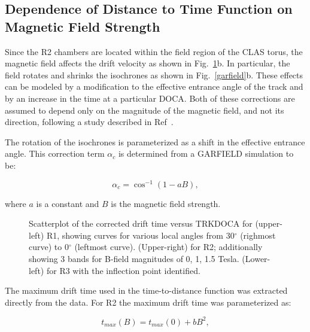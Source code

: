 \documentclass{article}
\begin{document}
\subsection{Dependence of Distance to Time Function on Magnetic Field Strength}
Since the R2 chambers are located within the field region of the CLAS torus, the 
magnetic field affects the drift velocity as shown in 
Fig.~\ref{xvst}b.  In particular, the field rotates and shrinks the isochrones
as shown in Fig.~\ref{garfield}b.  These effects can be modeled by a 
modification to the effective entrance angle of the track and by an increase 
in the time at a particular DOCA.  Both of these corrections are assumed to depend only on the 
magnitude of the magnetic field, and not its direction, following a study 
described in Ref~\cite{MM-IEEE}.  

The rotation of the isochrones is parameterized as a shift in the effective
entrance angle.  This correction term $\alpha_c$ is determined from a 
GARFIELD simulation to be:

\begin{equation} 
\label{eq-bang}
\alpha_c = \cos^{-1}(1 - a B), 
\end{equation}

\noindent
where $a$ is a constant and $B$ is the magnetic field strength.

\begin{figure}[htb]
\vspace{15.cm} 
\caption{\small{Scatterplot of the corrected drift time versus TRKDOCA for 
(upper-left) R1, showing curves for various local angles from 30$^{\circ}$
(righmost curve) to 0$^{\circ}$ (leftmost curve).  (Upper-right) for R2; 
additionally showing 3 bands for B-field magnitudes of 0, 1, 1.5 Tesla.
(Lower-left) for R3 with the inflection point identified.}}
\label{xvst}
\end{figure}


The maximum drift time used in the time-to-distance function was extracted 
directly from the data.  For R2 the maximum drift time was parameterized as:

\begin{equation} 
\label{eq-bmax}
t_{max}(B) = t_{max}(0) + b B^2,
\end{equation}
\end{document}
